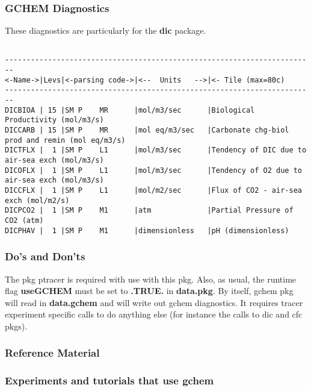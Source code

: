 \subsubsection{GCHEM Diagnostics}
\label{sec:pkg:gchem:diagnostics}

These diagnostics are particularly for the {\bf dic} package.

{\footnotesize
\begin{verbatim}

------------------------------------------------------------------------
<-Name->|Levs|<-parsing code->|<--  Units   -->|<- Tile (max=80c) 
------------------------------------------------------------------------
DICBIOA | 15 |SM P    MR      |mol/m3/sec      |Biological Productivity (mol/m3/s)
DICCARB | 15 |SM P    MR      |mol eq/m3/sec   |Carbonate chg-biol prod and remin (mol eq/m3/s)
DICTFLX |  1 |SM P    L1      |mol/m3/sec      |Tendency of DIC due to air-sea exch (mol/m3/s)
DICOFLX |  1 |SM P    L1      |mol/m3/sec      |Tendency of O2 due to air-sea exch (mol/m3/s)
DICCFLX |  1 |SM P    L1      |mol/m2/sec      |Flux of CO2 - air-sea exch (mol/m2/s)
DICPCO2 |  1 |SM P    M1      |atm             |Partial Pressure of CO2 (atm)
DICPHAV |  1 |SM P    M1      |dimensionless   |pH (dimensionless)
\end{verbatim}
}

\subsubsection{Do's and Don'ts}

The pkg ptracer is required with use with this pkg. Also, as usual, the
runtime flag \textbf{useGCHEM} must be set to \textbf{.TRUE.} in \textbf{data.pkg}.
By itself, gchem pkg will read in \textbf{data.gchem} and will
write out gchem diagnostics. It requires tracer experiment
specific calls to do anything else (for instance the calls
to dic and cfc pkgs).

\subsubsection{Reference Material}

\subsubsection{Experiments and tutorials that use gchem}
\label{sec:pkg:gchem:experiments}

